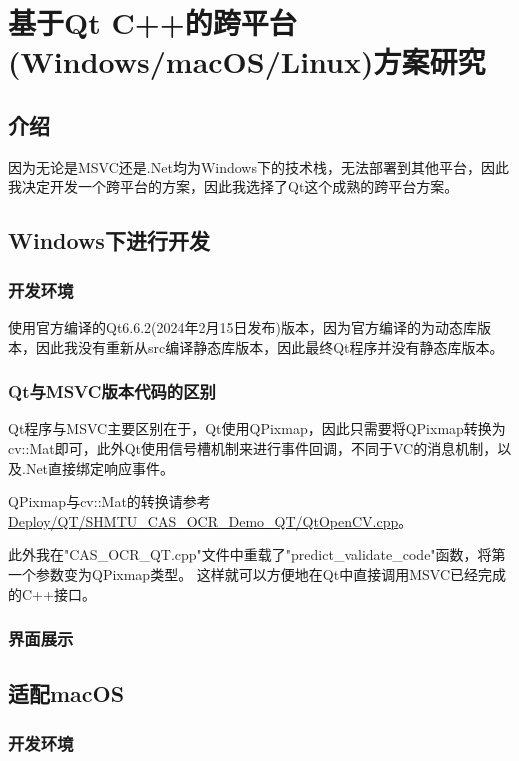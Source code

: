 \chapter{基于Qt C++的跨平台(Windows/macOS/Linux)方案研究}
\label{chapter:11}

\section{介绍}

因为无论是MSVC还是.Net均为Windows下的技术栈，无法部署到其他平台，因此我决定开发一个跨平台的方案，因此我选择了Qt这个成熟的跨平台方案。

\section{Windows下进行开发}

\subsection{开发环境}

使用官方编译的Qt6.6.2(2024年2月15日发布)版本，因为官方编译的为动态库版本，因此我没有重新从src编译静态库版本，因此最终Qt程序并没有静态库版本。

\subsection{Qt与MSVC版本代码的区别}

Qt程序与MSVC主要区别在于，Qt使用QPixmap，因此只需要将QPixmap转换为cv::Mat即可，此外Qt使用信号槽机制来进行事件回调，不同于VC的消息机制，以及.Net直接绑定响应事件。

QPixmap与cv::Mat的转换请参考\url{Deploy/QT/SHMTU_CAS_OCR_Demo_QT/QtOpenCV.cpp}。

此外我在"CAS\_OCR\_QT.cpp"文件中重载了"predict\_validate\_code"函数，将第一个参数变为QPixmap类型。
这样就可以方便地在Qt中直接调用MSVC已经完成的C++接口。

\subsection{界面展示}

\section{适配macOS}

\subsection{开发环境}

